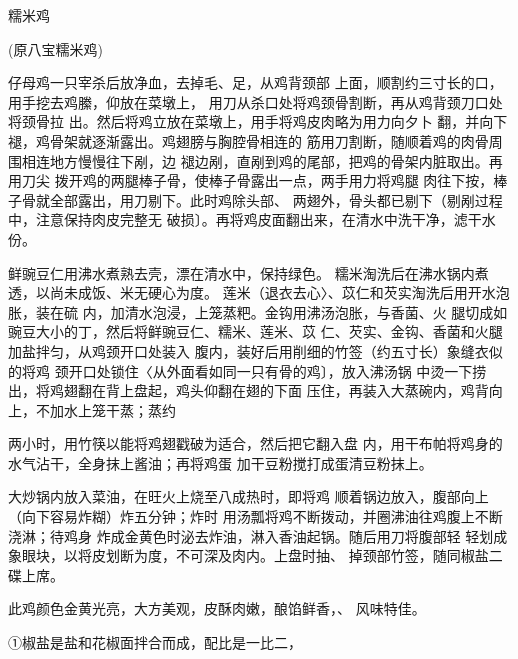 \begin{recipe}{糯米鸡}

(原八宝糯米鸡)

\ingredients



\cooking

\step 	仔母鸡一只宰杀后放净血，去掉毛、足，从鸡背颈部 上面，顺割约三寸长的口，用手挖去鸡縢，仰放在菜墩上， 用刀从杀口处将鸡颈骨割断，再从鸡背颈刀口处将颈骨拉 出。然后将鸡立放在菜墩上，用手将鸡皮肉略为用力向夕卜 翻，并向下褪，鸡骨架就逐渐露出。鸡翅膀与胸腔骨相连的 筋用刀割断，随顺着鸡的肉骨周围相连地方慢慢往下剐，边 褪边剐，直剐到鸡的尾部，把鸡的骨架内脏取出。再用刀尖 拨开鸡的两腿棒子骨，使棒子骨露出一点，两手用力将鸡腿 肉往下按，棒子骨就全部露出，用刀剔下。此时鸡除头部、 两翅外，骨头都已剔下（剔剐过程中，注意保持肉皮完整无 破损〕。再将鸡皮面翻出来，在清水中洗干净，滤干水份。

\step 	鲜豌豆仁用沸水煮熟去壳，漂在清水中，保持绿色。 糯米淘洗后在沸水锅内煮透，以尚未成饭、米无硬心为度。 莲米（退衣去心〉、苡仁和芡实淘洗后用开水泡胀，装在硫 内，加清水泡浸，上笼蒸粑。金钩用沸汤泡胀，与香菌、火 腿切成如豌豆大小的丁，然后将鲜豌豆仁、糯米、莲米、苡 仁、芡实、金钩、香菌和火腿加盐拌匀，从鸡颈开口处装入 腹内，装好后用削细的竹签（约五寸长）象缝衣似的将鸡 颈开口处锁住〈从外面看如同一只有骨的鸡〕，放入沸汤锅 中烫一下捞出，将鸡翅翻在背上盘起，鸡头仰翻在翅的下面 压住，再装入大蒸碗内，鸡背向上，不加水上笼干蒸；蒸约

两小时，用竹筷以能将鸡翅戳破为适合，然后把它翻入盘 内，用干布帕将鸡身的水气沾干，全身抹上酱油；再将鸡蛋 加干豆粉搅打成蛋清豆粉抹上。

\step 大炒锅内放入菜油，在旺火上烧至八成热时，即将鸡 顺着锅边放入，腹部向上（向下容易炸糊）炸五分钟；炸时 用汤瓢将鸡不断拨动，并圈沸油往鸡腹上不断浇淋；待鸡身 炸成金黄色时泌去炸油，淋入香油起锅。随后用刀将腹部轻 轻划成象眼块，以将皮划断为度，不可深及肉内。上盘时抽、 掉颈部竹签，随同椒盐二碟上席。

\notes

此鸡颜色金黄光亮，大方美观，皮酥肉嫩，酿馅鲜香，、 风味特佳。

①椒盐是盐和花椒面拌合而成，配比是一比二，

\end{recipe}

